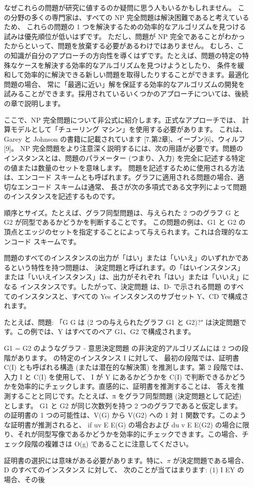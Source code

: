 
なぜこれらの問題が研究に値するのか疑問に思う人もいるかもしれません。
この分野の多くの専門家は、すべての NP 完全問題は解決困難であると考えているため、
これらの問題の 1 つを解決するための効率的なアルゴリズムを見つける試みは優先順位が低いはずです。
ただし、問題が NP 完全であることがわかったからといって、問題を放棄する必要があるわけではありません。
むしろ、この知識が自分のアプローチの方向性を導くはずです。たとえば、問題の特定の特殊なケースを解決する効率的なアルゴリズムを見つけようとしたり、
条件を緩和して効率的に解決できる新しい問題を取得したりすることができます。最適化問題の場合、
常に「最適に近い」解を保証する効率的なアルゴリズムの開発を試みることができます。採用されているいくつかのアプローチについては、後続の章で説明します。

ここで、NP 完全問題について非公式に紹介します。正式なアプローチでは、
計算モデルとして「チューリング マシン」を使用する必要があります。
これは、Garey と Johnson の書籍に記載されています [7.第2章]、イーブン[6]、ウィルフ[9]。 
NP 完全問題をより注意深く説明するには、次の用語が必要です。問題のインスタンスとは、問題のパラメーター (つまり、入力) を完全に記述する特定の値または数量のセットを意味します。
問題を記述するために使用される方法は、エンコード スキームとも呼ばれます。グラフに適用される問題の場合、適切なエンコード スキームは通常、
長さが次の多項式である文字列によって問題のインスタンスを記述するものです。

順序とサイズ。たとえば、グラフ同型問題は、与えられた 2 つのグラフ G と G2 が同型であるかどうかを判断することです。
この問題の例は、G1 と G2 の頂点とエッジのセットを指定することによって与えられます。これは合理的なエンコード スキームです。

問題のすべてのインスタンスの出力が「はい」または「いいえ」のいずれかであるという特性を持つ問題は、
決定問題と呼ばれます。の「はいインスタンス」または「いいえインスタンス」は、出力がそれぞれ「はい」または「いいえ」になる
インスタンスです。したがって、決定問題 は、D- で示される問題  のすべてのインスタンスと、すべての Yes インスタンスのサブセット Y、CD で構成されます。

たとえば、問題: 「G G は (2 つの与えられたグラフ G1 と
G2)?" は決定問題です。この例では、Y はすべてのペア G1、G2 で構成されます。

G1 = G2 のようなグラフ - 意思決定問題 の非決定的アルゴリズムには 2 つの段階があります。 の特定のインスタンス I に対して、
最初の段階では、証明書 C(I) とも呼ばれる構造 (または潜在的な解決策) を推測します。第 2 段階では、入力 I と C(I) を使用して、
I が Y にあるかどうかを C(I) で判断できるかどうかを効率的にチェックします。直感的に、証明書を推測することは、
答えを推測することと同じです。たとえば、π をグラフ同型問題 (決定問題として記述) とします。 G1 と G2 が同じ次数列を持つ
 2 つのグラフであると仮定します。 の証明書の 1 つの可能性は、V(G) から V(G2) への 1 対 1 関数です。このような証明書が推測されると、 
 if uv E E(G) の場合および du v E E(G2) の場合に限り、それが同型写像であるかどうかを効率的にチェックできます。この場合、チェック段階の複雑さは O(g) 
 であることに注意してください。

証明書の選択には意味がある必要があります。特に、$\pi$ が決定問題である場合、D のすべてのインスタンス に対して、
次のことが当てはまります: (1) I EY の場合、その後